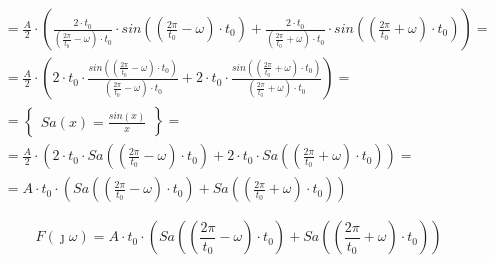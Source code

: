 \begin{task}
\begin{align*}
&=\frac{A}{2} \cdot \left(  \frac{2\cdot t_0}{\left(\frac{2\pi}{t_0} - \omega \right)\cdot t_0} \cdot sin\left(\left(\frac{2\pi}{t_0} - \omega \right) \cdot t_0 \right)  + \frac{2 \cdot t_0}{\left(\frac{2\pi}{t_0} + \omega \right)\cdot t_0} \cdot sin\left(\left(\frac{2\pi}{t_0} + \omega \right) \cdot t_0 \right) \right)=\\
&=\frac{A}{2} \cdot \left(  2\cdot t_0 \cdot \frac{ sin\left(\left(\frac{2\pi}{t_0} - \omega \right) \cdot t_0 \right)}{\left(\frac{2\pi}{t_0} - \omega \right)\cdot t_0}  + 2 \cdot t_0 \cdot \frac{sin\left(\left(\frac{2\pi}{t_0} + \omega \right) \cdot t_0 \right)}{\left(\frac{2\pi}{t_0} + \omega \right)\cdot t_0} \right)=\\
&=\begin{Bmatrix}
Sa(x)=\frac{sin(x)}{x}
\end{Bmatrix}=\\
&=\frac{A}{2} \cdot \left(  2\cdot t_0 \cdot Sa\left(\left(\frac{2\pi}{t_0} - \omega \right) \cdot t_0 \right) + 2 \cdot t_0 \cdot Sa\left(\left(\frac{2\pi}{t_0} + \omega \right) \cdot t_0 \right) \right)=\\
&=A \cdot t_0 \cdot \left( Sa\left(\left(\frac{2\pi}{t_0} - \omega \right) \cdot t_0 \right) + Sa\left(\left(\frac{2\pi}{t_0} + \omega \right) \cdot t_0 \right) \right)
\end{align*}



\begin{equation}
F(\jmath \omega)=A \cdot t_0 \cdot \left( Sa\left(\left(\frac{2\pi}{t_0} - \omega \right) \cdot t_0 \right) + Sa\left(\left(\frac{2\pi}{t_0} + \omega \right) \cdot t_0 \right) \right)
\end{equation}


\begin{figure}[H]
	\centering
\end{figure}
\end{task}
